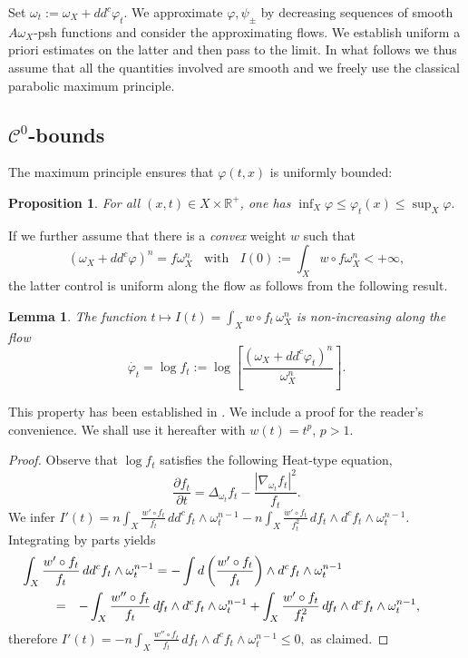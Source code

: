 \documentclass[a4paper,11pt,leqno,english]{smfart}
\theoremstyle{plain}
\theoremstyle{plain}
\numberwithin{equation}{section} %
\numberwithin{figure}{section} %
\theoremstyle{plain}
\newtheorem{prop}[thm]{Proposition} %
\theoremstyle{plain}
\newtheorem{lem}[thm]{Lemma} %
\theoremstyle{remark}
\theoremstyle{remark}
\theoremstyle{definition}
\theoremstyle{plain}
\theoremstyle{plain}
\theoremstyle{definition}
\newcommand{\R}{{\mathbb{R}}}
\newcommand{\f}{\varphi}
\newcommand{\p}{\psi}
\begin{document}
Set $\omega_t:=\omega_X+dd^c \f_t$.
We approximate $\f, \p_{\pm}$ by decreasing sequences of smooth  $A \omega_X$-psh functions
and consider the approximating flows.  We establish uniform a priori estimates on the latter
and then pass to the limit.
In what follows we thus assume that all the quantities involved are smooth and we freely use the classical parabolic maximum principle.

 

\subsection{${\mathcal C}^0$-bounds}


The   maximum principle ensures that
$\f(t,x)$ is uniformly bounded:

\begin{prop} \label{pro:c0bounds}
For all $(x,t) \in X \times \R^+$, one has
$
\inf_X \f \leq \f_t(x) \leq \sup_X \f.
$
\end{prop}


If we further assume that there is a {\it convex}
 weight $w$ such that
$$
(\omega_X+dd^c \f)^n=f \omega_X^n
\; \; \text{ with } \; \;
I(0):=\int_X w \circ f \omega_X^n <+\infty,
$$
the latter control is   uniform along the flow as  follows from the following result.


\begin{lem} \label{lem:convexflot}
The function $t \mapsto  I(t)=\int_X w \circ f_t \, \omega_X^n$
is non-increasing along the flow
$$
{\dot{\f_t}}=\log f_t:= \log  \left[ \frac{(\omega_X+dd^c \f_t)^n}{\omega_X^n} \right].
$$
\end{lem}



This property has been established in \cite[Proposition 3.5]{GZ17}.
We include a proof for the reader's convenience.
We shall use it hereafter with $w(t)=t^p$, $p>1$.
 
 
 

\begin{proof}
Observe that
$\log f_t$ satisfies the following Heat-type equation,
$$
\frac{\partial f_t}{\partial t}=\Delta_{\omega_t} f_t-\frac{|\nabla_{\omega_t} f_t|^2}{f_t}.
$$
We infer
$
I'(t) = n\int_X \frac{w' \circ f_t}{f_t} \, dd^c f_t \wedge \omega_t^{n-1}
-n\int_X \frac{w' \circ f_t}{f_t^2} \, df_t \wedge d^c f_t \wedge \omega_t^{n-1}.
$
Integrating by parts yields
\begin{eqnarray*}
\lefteqn{  \! \! \! \! \! \! \!  \! \! \! \! \! \! \! 
\int_X \frac{w' \circ f_t}{f_t} \, dd^c f_t \wedge \omega_t^{n-1}
= -\int d \left( \frac{w' \circ f_t}{f_t} \right) \wedge d^c f_t \wedge \omega_t^{n-1}} \\
&=& -\int_X \frac{w'' \circ f_t}{f_t} \, df_t \wedge d^c f_t \wedge \omega_t^{n-1}
+\int_X \frac{w' \circ f_t}{f_t^2} \, df_t \wedge d^c f_t \wedge \omega_t^{n-1},
\end{eqnarray*}
therefore
$
I'(t) = -n \int_X \frac{w'' \circ f_t}{f_t} \, df_t \wedge d^c f_t \wedge \omega_t^{n-1} \leq 0,
$
as claimed.
\end{proof}
\end{document}
